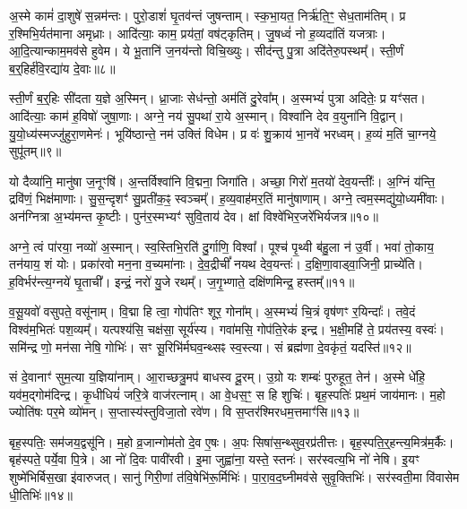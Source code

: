 अ॒स्मे कामं॑ दा॒शुषे॑ स॒न्नम॑न्तः।
पुरो॒डाशं॑ घृ॒तव॑न्तं जुषन्ताम्।
स्क॒भा॒यत॒ निर्\mbox{}ऋ॑ति॒ꣳ॒ सेध॒ताम॑तिम्।
प्र र॒श्मिभि॒र्यत॑माना अमृध्राः।
आदि॑त्याः॒ काम॒ प्रय॑तां॒ वष॑ट्कृतिम्।
जु॒षध्वं॑ नो ह॒व्यदा॑तिं यजत्राः।
आ॒दि॒त्यान्काम॒मव॑से हुवेम।
ये भू॒तानि॑ ज॒नय॑न्तो विचि॒ख्युः।
सीद॑न्तु पु॒त्रा अदि॑तेरु॒पस्थम्᳚।
स्ती॒र्णं ब॒र्॒हिर्\mbox{}ह॑वि॒रद्या॑य दे॒वाः॥८॥\ip

स्ती॒र्णं ब॒र्॒हिः सी॑दता य॒ज्ञे अ॒स्मिन्।
ध्रा॒जाः सेध॑न्तो॒ अम॑तिं दु॒रेवा᳚म्।
अ॒स्मभ्यं॑ पुत्रा अदितेः॒ प्र यꣳ॑सत।
आदि॑त्याः॒ काम॑ ह॒विषो॑ जुषा॒णाः।
अग्ने॒ नय॑ सु॒पथा॑ रा॒ये अ॒स्मान्।
विश्वा॑नि देव व॒युना॑नि वि॒द्वान्।
यु॒यो॒ध्य॑स्मज्जु॑हुरा॒णमेनः॑।
भूयि॑ष्ठान्ते॒ नम॑ उक्तिं विधेम।
प्र वः॑ शु॒क्राय॑ भा॒नवे॑ भरध्वम्।
ह॒व्यं म॒तिं चा॒ग्नये॒ सुपू॑तम्॥९॥\ip

यो दैव्या॑नि॒ मानु॑षा ज॒नूꣳषि॑।
अ॒न्तर्विश्वा॑नि वि॒द्मना॒ जिगा॑ति।
अच्छा॒ गिरो॑ म॒तयो॑ देव॒यन्तीः᳚।
अ॒ग्निं य॑न्ति॒ द्रवि॑णं॒ भिक्ष॑माणाः।
सु॒स॒न्दृशꣳ॑ सु॒प्रती॑क॒ꣴ॒ स्वञ्चम्᳚।
ह॒व्य॒वाह॑मर॒तिं मानु॑षाणाम्।
अग्ने॒ त्वम॒स्मद्यु॑यो॒ध्यमी॑वाः।
अन॑ग्नित्रा अ॒भ्य॑मन्त कृ॒ष्टीः।
पुन॑र॒स्मभ्यꣳ॑ सुवि॒ताय॑ देव।
क्षां विश्वे॑भिर॒जरे॑भिर्यजत्र॥१०॥\ip

अग्ने॒ त्वं पा॑रया॒ नव्यो॑ अ॒स्मान्।
स्व॒स्तिभि॒रति॑ दु॒र्गाणि॒ विश्वा᳚।
पूश्च॑ पृ॒थ्वी ब॑हु॒ला न॑ उ॒र्वी।
भवा॑ तो॒काय॒ तन॑याय॒ शं योः।
प्रका॑रवो मन॒ना व॒च्यमा॑नाः।
दे॒व॒द्रीचीं᳚ नयथ देव॒यन्तः॑।
द॒क्षि॒णा॒वाड्वा॒जिनी॒ प्राच्ये॑ति।
ह॒विर्भर॑न्त्य॒ग्नये॑ घृ॒ताची᳚।
इन्द्रं॒ नरो॑ यु॒जे रथम्᳚।
ज॒गृ॒भ्णाते॒ दक्षि॑णमिन्द्र॒ हस्तम्᳚॥११॥\ip

व॒सू॒यवो॑ वसुपते॒ वसू॑नाम्।
वि॒द्मा हि त्वा॒ गोप॑तिꣳ शूर॒ गोना᳚म्।
अ॒स्मभ्यं॑ चि॒त्रं वृष॑णꣳ र॒यिन्दाः᳚।
तवे॒दं विश्व॑म॒भितः॑ पश॒व्यम्᳚।
यत्पश्य॑सि॒ चक्ष॑सा॒ सूर्य॑स्य।
गवा॑मसि॒ गोप॑ति॒रेक॑ इन्द्र।
भ॒क्षी॒महि॑ ते॒ प्रय॑तस्य॒ वस्वः॑।
समि॑न्द्र णो॒ मन॑सा नेषि॒ गोभिः॑।
सꣳ सू॒रिभि॑र्मघव॒न्थ्सꣴ स्व॒स्त्या।
सं ब्रह्म॑णा दे॒वकृ॑तं॒ यदस्ति॑॥१२॥\ip

सं दे॒वानाꣳ॑ सुम॒त्या य॒ज्ञिया॑नाम्।
आ॒राच्छत्रु॒मप॑ बाधस्व दू॒रम्।
उ॒ग्रो यः शम्बः॑ पुरुहूत॒ तेन॑।
अ॒स्मे धे॑हि॒ यव॑म॒द्गोम॑दिन्द्र।
कृ॒धीधियं॑ जरि॒त्रे वाज॑रत्नाम्।
आ वे॒धस॒ꣳ॒ स हि शुचिः॑।
बृह॒स्पतिः॑ प्रथ॒मं जाय॑मानः।
म॒हो ज्योति॑षः पर॒मे व्यो॑मन्।
स॒प्तास्य॑स्तुविजा॒तो रवे॑ण।
वि स॒प्तर॑श्मिरधम॒त्तमाꣳ॑सि॥१३॥\ip

बृह॒स्पतिः॒ सम॑जय॒द्वसू॑नि।
म॒हो व्र॒जान्गोम॑तो दे॒व ए॒षः।
अ॒पः सिषा॑स॒न्थ्सुव॒रप्र॑तीत्तः।
बृह॒स्पति॒र्॒हन्त्य॒मित्र॑म॒र्कैः।
बृह॑स्पते॒ पर्ये॒वा पि॒त्रे।
आ नो॑ दि॒वः पावी॑रवी।
इ॒मा जुह्वा॑ना॒ यस्ते॒ स्तनः॑।
सर॑स्वत्य॒भि नो॑ नेषि।
इ॒यꣳ शुष्मे॑भिर्बिस॒खा इ॑वारुजत्।
सानु॑ गिरी॒णां त॑वि॒षेभि॑रू॒र्मिभिः॑।
पा॒रा॒व॒द॒घ्नीमव॑से सुवृ॒क्तिभिः॑।
सर॑स्वती॒मा वि॑वासेम धी॒तिभिः॑॥१४॥\ip\anuvakamend[दे॒व॒यानै᳚र्दे॒वाः सुपू॑तं यजत्र॒ हस्त॒मस्ति॒ तमाꣴ॑स्यू॒र्मिभि॒र्द्वे च॑]

